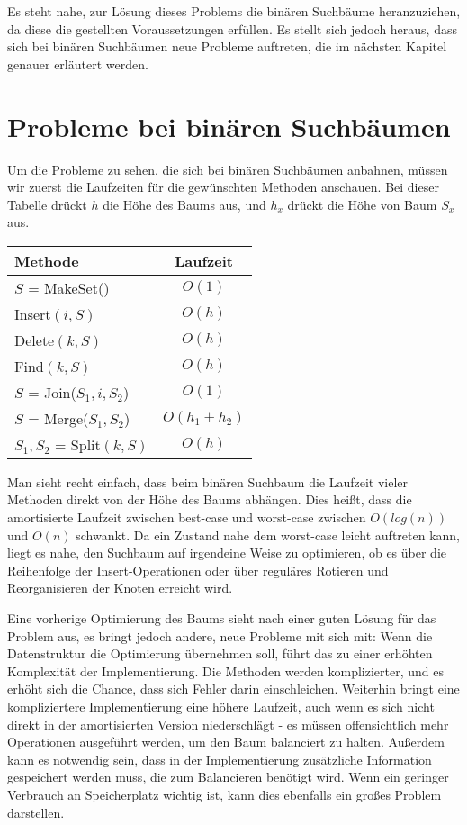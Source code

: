 \documentclass[a4paper]{scrreprt}
\theoremstyle{definition}
\begin{document}
Es steht nahe, zur Lösung dieses Problems die binären Suchbäume heranzuziehen, da diese die gestellten Voraussetzungen erfüllen.
Es stellt sich jedoch heraus, dass sich bei binären Suchbäumen neue Probleme auftreten, die im nächsten Kapitel genauer erläutert werden.

\section{Probleme bei binären Suchbäumen}
\label{sec:binaryproblems}

Um die Probleme zu sehen, die sich bei binären Suchbäumen anbahnen, müssen wir zuerst die Laufzeiten für die gewünschten Methoden anschauen. Bei dieser Tabelle drückt $h$ die Höhe des Baums aus, und $h_x$ drückt die Höhe von Baum $S_x$ aus.

\begin{tabular}{l|c}
	Methode & Laufzeit\\
	\hline
	$S$ = MakeSet() & $O(1)$\\
	Insert$(i, S)$ & $O(h)$ \\
	Delete$(k, S)$ & $O(h)$ \\
	Find$(k, S)$ & $O(h)$ \\
	$S$ = Join($S_1, i, S_2$) & $O(1)$ \\
	$S$ = Merge($S_1, S_2$) & $O(h_1 + h_2)$ \\
	$S_1, S_2$ = Split$(k, S)$ & $O(h)$
\end{tabular}


Man sieht recht einfach, dass beim binären Suchbaum die Laufzeit vieler Methoden direkt von der Höhe des Baums abhängen. 
Dies heißt, dass die amortisierte Laufzeit zwischen best-case und worst-case zwischen $O(log(n))$ und $O(n)$ schwankt.
Da ein Zustand nahe dem worst-case leicht auftreten kann, liegt es nahe, den Suchbaum auf irgendeine Weise zu optimieren, ob es über die Reihenfolge der Insert-Operationen oder über reguläres Rotieren und Reorganisieren der Knoten erreicht wird. \par

Eine vorherige Optimierung des Baums sieht nach einer guten Lösung für das Problem aus, es bringt jedoch andere, neue Probleme mit sich mit:
Wenn die Datenstruktur die Optimierung übernehmen soll, führt das zu einer erhöhten Komplexität der Implementierung. 
Die Methoden werden komplizierter, und es erhöht sich die Chance, dass sich Fehler darin einschleichen. 
Weiterhin bringt eine kompliziertere Implementierung eine höhere Laufzeit, auch wenn es sich nicht direkt in der amortisierten Version niederschlägt - es müssen offensichtlich mehr Operationen ausgeführt werden, um den Baum balanciert zu halten. 
Außerdem kann es notwendig sein, dass in der Implementierung zusätzliche Information gespeichert werden muss, die zum Balancieren benötigt wird. 
Wenn ein geringer Verbrauch an Speicherplatz wichtig ist, kann dies ebenfalls ein großes Problem darstellen. \par
\end{document}
